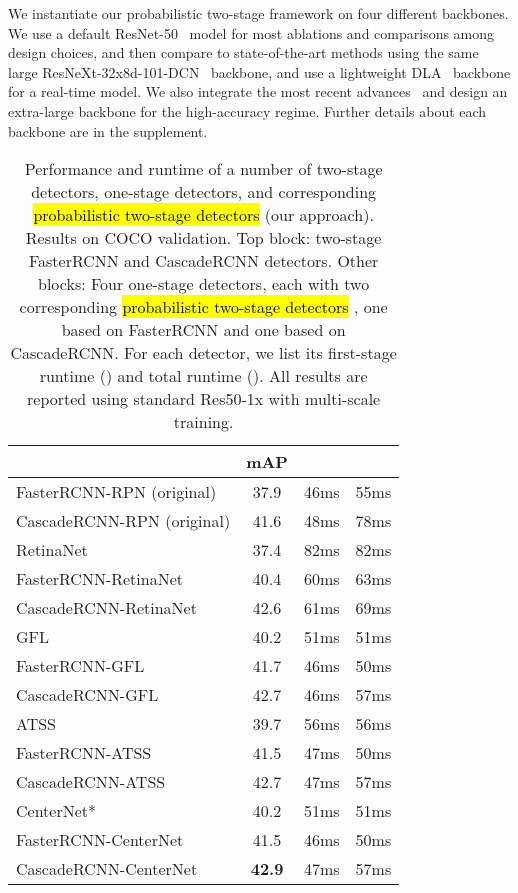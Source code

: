 \documentclass{article}
\newcommand{\ctext}[3][RGB]{\begingroup
  \definecolor{hlcolor}{#1}{#2}\sethlcolor{hlcolor}\hl{#3}\endgroup
}
\begin{document}
We instantiate our probabilistic two-stage framework on four different backbones.
We use a default ResNet-50~\cite{he2016deep} model for most ablations and comparisons among design choices, and then compare to state-of-the-art methods using the same large ResNeXt-32x8d-101-DCN~\cite{xie2017aggregated} backbone, and use a lightweight DLA~\cite{yu2018deep} backbone for a real-time model.
We also integrate the most recent advances~\cite{zoph2020rethinking,tan2020efficientdet,gao2019res2net} and design an extra-large backbone for the high-accuracy regime.
Further details about each backbone are in the supplement.


{
\begin{table}[t]
\centering
\begin{tabular}{l@{\ \ }c@{\ \ \ \ }c@{\ \ \ \ }c}
\toprule
& mAP &  &  \\
\midrule
FasterRCNN-RPN (original) & 37.9 & 46ms & 55ms \\
CascadeRCNN-RPN (original) & 41.6 & 48ms & 78ms \\
\midrule
RetinaNet~\cite{lin2018focal} & 37.4 & 82ms & 82ms \\
\rowcolor{lightgray}
FasterRCNN-RetinaNet & 40.4 & 60ms & 63ms \\
\rowcolor{lightgray}
CascadeRCNN-RetinaNet & 42.6 & 61ms & 69ms \\
\midrule
GFL~\cite{li2020generalized} & 40.2 & 51ms & 51ms\\
\rowcolor{lightgray}
FasterRCNN-GFL & 41.7 & 46ms & 50ms \\
\rowcolor{lightgray}
CascadeRCNN-GFL & 42.7 & 46ms & 57ms \\
\midrule
ATSS~\cite{zhang2020bridging} & 39.7 & 56ms & 56ms\\
\rowcolor{lightgray}
FasterRCNN-ATSS & 41.5 & 47ms & 50ms \\
\rowcolor{lightgray}
CascadeRCNN-ATSS & 42.7 & 47ms & 57ms \\
\midrule
CenterNet* & 40.2 & 51ms & 51ms\\
\rowcolor{lightgray}
FasterRCNN-CenterNet & 41.5 & 46ms & 50ms \\
\rowcolor{lightgray}
CascadeRCNN-CenterNet & \textbf{42.9} & 47ms & 57ms\\
\bottomrule
\end{tabular}
\vspace{-2mm}
\caption{Performance and runtime of a number of two-stage detectors, one-stage detectors, and corresponding \ctext[RGB]{238,238,236}{probabilistic two-stage detectors} (our approach). Results on COCO validation.
Top block: two-stage FasterRCNN and CascadeRCNN detectors.
Other blocks: Four one-stage detectors, each with two corresponding \ctext[RGB]{238,238,236}{probabilistic two-stage detectors}, one based on FasterRCNN and one based on CascadeRCNN.
For each detector, we list its first-stage runtime () and total runtime ().
All results are reported using standard Res50-1x with multi-scale training.
}
\label{table:rpn}
\vspace{-5mm}
\end{table}
}
\end{document}
